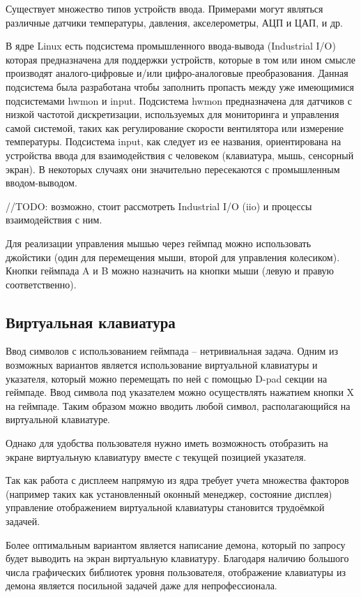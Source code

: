 Существует множество типов устройств ввода. Примерами могут являться различные датчики температуры, давления, акселерометры, АЦП и ЦАП, и др.

В ядре Linux есть подсистема промышленного ввода-вывода (Industrial I/O) которая предназначена для поддержки устройств, которые в том или ином смысле производят аналого-цифровые и/или цифро-аналоговые преобразования. Данная подсистема была разработана чтобы заполнить пропасть между уже имеющимися подсистемами hwmon и input. Подсистема hwmon предназначена для датчиков с низкой частотой дискретизации, используемых для мониторинга и управления самой системой, таких как регулирование скорости вентилятора или измерение температуры. Подсистема input, как следует из ее названия, ориентирована на устройства ввода для взаимодействия с человеком (клавиатура, мышь, сенсорный экран). В некоторых случаях они значительно пересекаются с промышленным вводом-выводом.

//TODO: возможно, стоит рассмотреть Industrial I/O (iio) и процессы взаимодействия с ним.

Для реализации управления мышью через геймпад можно использовать джойстики (один для перемещения мыши, второй для управления колесиком). Кнопки геймпада A и B можно назначить на кнопки мыши (левую и правую соответственно).

\subsection{Виртуальная клавиатура}

Ввод символов с использованием геймпада -- нетривиальная задача. Одним из возможных вариантов является использование виртуальной клавиатуры и указателя, который можно перемещать по ней с помощью D-pad секции на геймпаде. Ввод символа под указателем можно осуществлять нажатием кнопки X на геймпаде. Таким образом можно вводить любой символ, располагающийся на виртуальной клавиатуре.

Однако для удобства пользователя нужно иметь возможность отобразить на экране виртуальную клавиатуру вместе с текущей позицией указателя.

Так как работа с дисплеем напрямую из ядра требует учета множества факторов (например таких как установленный оконный менеджер, состояние дисплея) управление отображением виртуальной клавиатуры становится трудоёмкой задачей.

Более оптимальным вариантом является написание демона, который по запросу будет выводить на экран виртуальную клавиатуру. Благодаря наличию большого числа графических библиотек уровня пользователя, отображение клавиатуры из демона является посильной задачей даже для непрофессионала.

